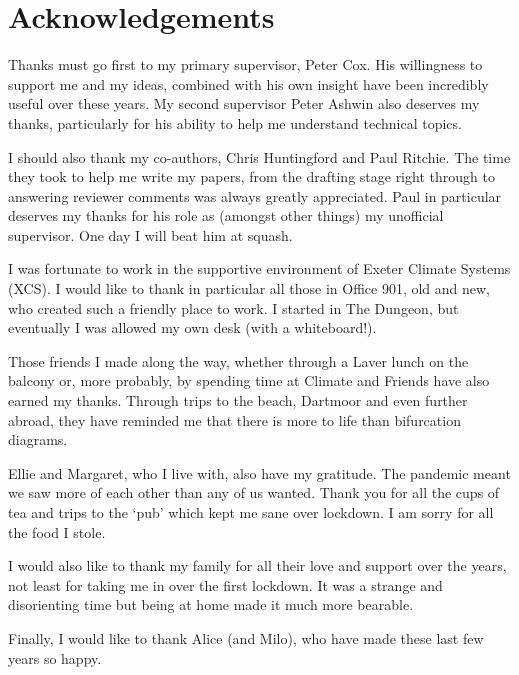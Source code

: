 \chapter{Acknowledgements}

Thanks must go first to my primary supervisor, Peter Cox. His willingness to support me and my ideas, combined with his own insight
have been incredibly useful over these years. My second supervisor Peter Ashwin also deserves my thanks,
particularly for his ability to help me understand technical topics.

I should also thank my co-authors, Chris Huntingford and Paul Ritchie. The time they took to help me
write my papers, from the drafting stage right through to answering reviewer comments was always greatly appreciated. Paul
in particular deserves my thanks for his role as (amongst other things) my unofficial supervisor. One day I will beat him at squash.

I was fortunate to work in the supportive environment of Exeter Climate Systems (XCS). I would like to thank in particular
all those in Office 901, old and new, who created such a friendly place to work. I started in The Dungeon,
but eventually I was allowed my own desk (with a whiteboard!).

Those friends I made along the way, whether through a Laver lunch on the balcony or, more probably, by spending time at Climate and
Friends have also earned my thanks. Through trips to the beach, Dartmoor and even further abroad, they have reminded me that there is more to life
than bifurcation diagrams.

Ellie and Margaret, who I live with, also have my gratitude. The pandemic meant we saw more of each other than any of us wanted.
Thank you for all the cups of tea and trips to the `pub' which kept me sane over lockdown. I am sorry for
all the food I stole.

I would also like to thank my family for all their love and support over the years, not least for taking me in over the first lockdown.
It was a strange and disorienting time but being at home made it much more bearable.

Finally, I would like to thank Alice (and Milo), who have made these last few years so happy.